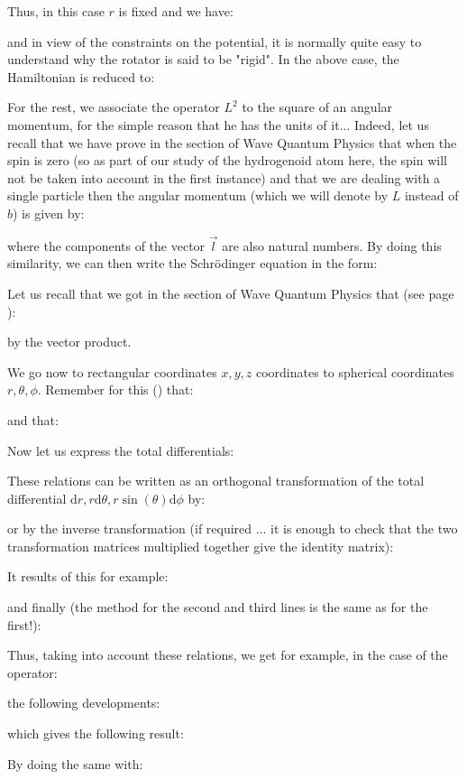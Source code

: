 	Thus, in this case $r$ is fixed and we have:
	
	and in view of the constraints on the potential, it is normally quite easy to understand why the rotator is said to be "rigid". In the above case, the Hamiltonian is reduced to:
	
	
	For the rest, we associate the operator $L^2$ to the square of an angular momentum, for the simple reason that he has the units of it... Indeed, let us recall that we have prove in the section of Wave Quantum Physics that when the spin is zero (so as part of our study of the hydrogenoid atom here, the spin will not be taken into account in the first instance) and that we are dealing with a single particle then the angular momentum (which we will denote by $L$ instead of $b$) is given by:
	
	where the components of the vector $\vec{l}$ are also natural numbers. By doing this similarity, we can then write the Schrödinger equation in the form:
	
	Let us recall that we got in the section of Wave Quantum Physics that (see page \pageref{angular momentum and spin}):
	
	by the vector product.
	
	We go now to rectangular coordinates $x, y, z$ coordinates to spherical coordinates $r,\theta,\phi$. Remember for this () that:
	
	and that:
	
	Now let us express the total differentials:
	
	These relations can be written as an orthogonal transformation of the total differential $\mathrm{d}r,r\mathrm{d}\theta,r\sin(\theta)\mathrm{d}\phi$ by:
	
	or by the inverse transformation (if required ... it is enough to check that the two transformation matrices multiplied together give the identity matrix):
	
	It results of this for example:
	
	and finally (the method for the second and third lines is the same as for the first!):
	
	Thus, taking into account these relations, we get for example, in the case of the operator:
	
	the following developments:
	
	which gives the following result:
	
	By doing the same with:
	
